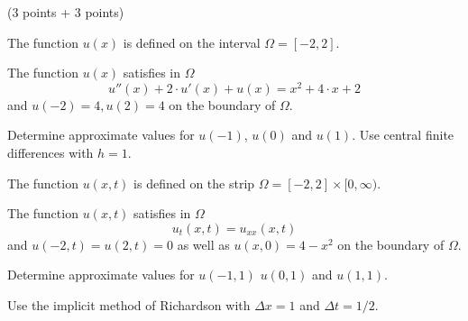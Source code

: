 (3 points + 3 points)
\begin{teilaufgaben}
\item
The function $u(x)$ is defined on the interval $\Omega = [-2,2].$ 

The function $u(x)$ satisfies in $\Omega$ 
\[
u''(x) + 2 \cdot u'(x) + u(x) = x^2 + 4 \cdot x + 2
\]
and  $u(-2) = 4, u(2) = 4$ on the boundary of $\Omega$. 

Determine approximate values for $u(-1)$, $u(0)$ and $u(1)$. 
Use central finite differences with $h = 1$. 

\item
The function $u(x,t)$ is defined on the strip
$\Omega = [-2, 2] \times [0,\infty)$.

\vspace{2mm}

The function $u(x,t)$ satisfies in $\Omega$
\[
u_{t}(x,t) = u_{xx}(x,t)
\]
and $u(-2,t) = u(2,t) = 0$ as well as $u(x,0) = 4 - x^2$ on the
boundary of $\Omega$.

Determine approximate values for $u(-1,1)$ $u(0,1)$ and $u(1,1)$. 

Use the implicit method of Richardson with $\Delta x = 1$ and
$\Delta t = 1/2.$
\end{teilaufgaben}

